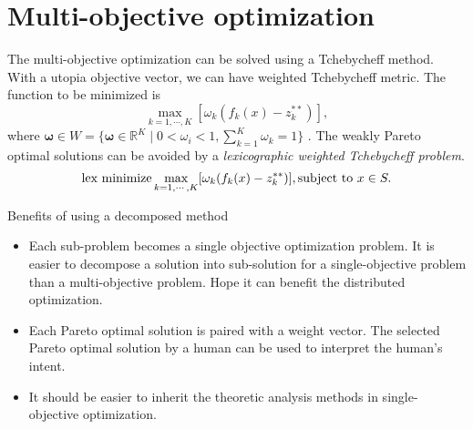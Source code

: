 \section{Multi-objective optimization}

The multi-objective optimization can be solved using a Tchebycheff method.
With a utopia objective vector, we can have weighted Tchebycheff metric.
The function to be minimized is  
\begin{equation}
\max_{k=1, \cdots , K} [ \omega_{k}  ( f_{k} (x) - z^{**}_{k} ) ],
\end{equation}
where $ \mathbf{\omega} \in W = \{ \mathbf{\omega} \in \mathbf{\mathbb{R}}^{K} \mid 0 < \omega_{i} < 1 , \sum^{K}_{k=1} \omega_{k} = 1 \} $ .
The weakly Pareto optimal solutions can be avoided by a \emph{lexicographic weighted Tchebycheff problem}.
\begin{equation}
\mbox{lex minimize} \max_{k=1, \cdots , K} [ \omega_{k}  ( f_{k} (x) - z^{**}_{k} ) ], \\
\mbox{subject to } x \in S.
\end{equation}

Benefits of using a decomposed method
\begin{itemize}
\item Each sub-problem becomes a single objective optimization problem.
It is easier to decompose a solution into sub-solution for a single-objective problem than a multi-objective problem.
Hope it can benefit the distributed optimization.
\item Each Pareto optimal solution is paired with a weight vector.
The selected Pareto optimal solution by a human can be used to interpret the human's intent.
\item It should be easier to inherit the theoretic analysis methods in single-objective optimization.
\end{itemize}